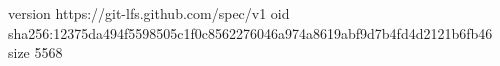 version https://git-lfs.github.com/spec/v1
oid sha256:12375da494f5598505c1f0c8562276046a974a8619abf9d7b4fd4d2121b6fb46
size 5568

